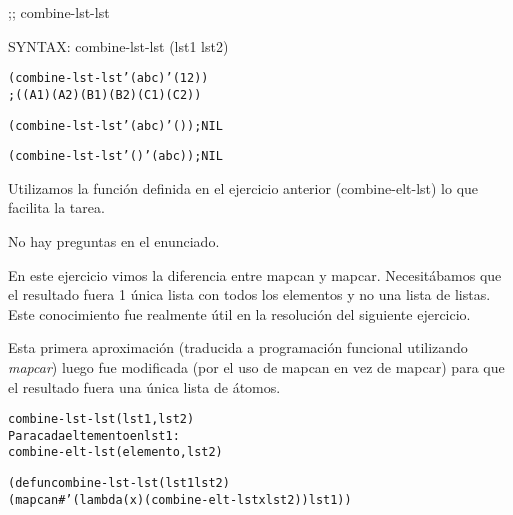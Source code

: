 \begin{aibox}{\function}
;; combine-lst-lst

SYNTAX: combine-lst-lst (lst1 lst2)
\end{aibox}

\begin{aibox}{\examples}
\begin{alltt}
(combine-lst-lst '(a b c) '(1 2))
; ((A 1) (A 2) (B 1) (B 2) (C 1) (C 2))

(combine-lst-lst '(a b c) '()); NIL

(combine-lst-lst '() '(a b c)); NIL
\end{alltt}

\end{aibox}

\begin{aibox}{\comments}
Utilizamos la función definida en el ejercicio anterior (combine-elt-lst) lo que facilita la tarea.
\end{aibox}
\begin{aibox}{\answers}
No hay preguntas en el enunciado.
\end{aibox}
\begin{aibox}{\othercomments}
En este ejercicio vimos la diferencia entre mapcan y mapcar. Necesitábamos que el resultado fuera 1 única lista con todos los elementos y no una lista de listas. Este conocimiento fue realmente útil en la resolución del siguiente ejercicio.
\end{aibox}
\begin{aibox}{\pseudocode}
Esta primera aproximación (traducida a programación funcional utilizando \emph{mapcar}) luego fue modificada (por el uso de mapcan en vez de mapcar) para que el resultado fuera una única lista de átomos.
\begin{alltt}
combine-lst-lst (lst1,lst2)
    Para cada eltemento en lst1:
        combine-elt-lst (elemento,lst2)
\end{alltt}
\end{aibox}
\begin{aibox}{\code}

\begin{alltt}

(defun combine-lst-lst (lst1 lst2)
            (mapcan #'(lambda (x) (combine-elt-lst x lst2)) lst1))

\end{alltt}
\end{aibox}
